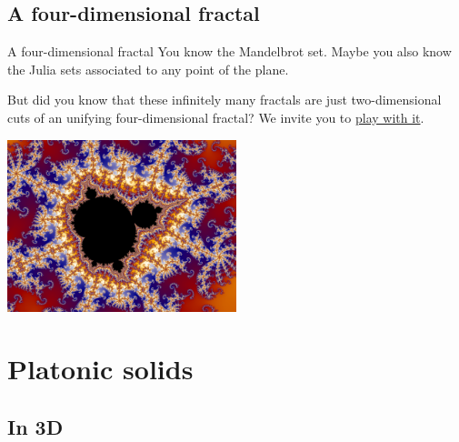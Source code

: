 \documentclass[12pt,compress,ngerman,utf8,t]{beamer}
\newcommand{\hil}[1]{{\usebeamercolor[fg]{item}{\textbf{#1}}}}
\begin{document}


\subsection{A four-dimensional fractal}

\begin{frame}{A four-dimensional fractal}
  You know the Mandelbrot set.
  Maybe you also know the Julia sets associated to any point of the plane.
  \bigskip

  But did you know that these infinitely many fractals are just two-dimensional
  cuts of an unifying four-dimensional fractal?
  We invite you to
  \href{http://rawgit.com/MatthiasHu/FractalsWebGL/4d/page.html}{play with it}.
  \bigskip

  \centering
  \includegraphics[width=0.5\textwidth]{images/mandelbrot}
  \par
\end{frame}



\section{Platonic solids}

\newcommand{\solid}[4]{\begin{column}{0.31\textwidth}\centering\hil{#2}\par#3 faces, #4 vertices\\\medskip\texttt{[image: \#1]}\end{column}}
\newcommand{\solidd}[3]{\begin{column}{0.35\textwidth}\centering\hil{#2}\par#3\\\medskip\texttt{[image: \#1]}\end{column}}


\subsection{In 3D}
\end{document}
